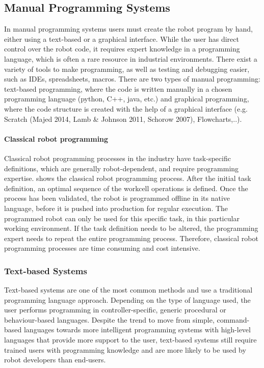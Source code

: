 \subsection{Manual Programming Systems}\label{subsec:Manual Programming Systems}
In manual programming systems users must create the robot program by hand, either using a text-based or a graphical interface.
While the user has direct control over the robot code, it requires expert knowledge in a programming language, which is often a rare resource in industrial environments.
There exist a variety of tools to make programming, as well as testing and debugging easier, such as IDEs, spreadsheets, macros.
There are two types of manual programming: text-based programming, where the code is written manually in a chosen programming language (python, C++, java, etc.) and graphical programming, where the code structure is created with the help of a graphical interface (e.g. Scratch (Majed 2014, Lamb \& Johnson 2011, Schorow 2007), Flowcharts,..). 

\paragraph{Classical robot programming}\label{par:Classical RP}
Classical robot programming processes in the industry have task-specific definitions, which are generally robot-dependent, and require programming expertise.
 shows the classical robot programming process.
After the initial task definition, an optimal sequence of the workcell operations is defined.
Once the process has been validated, the robot is programmed offline in its native language, before it is pushed into production for regular execution.
The programmed robot can only be used for this specific task, in this particular working environment.
If the task definition needs to be altered, the programming expert needs to repeat the entire programming process.
Therefore, classical robot programming processes are time consuming and cost intensive.

\subsubsection{Text-based Systems}\label{sssec:Text-based Systems}
Text-based systems are one of the most common methods and use a traditional programming language approach. 
Depending on the type of language used, the user performs programming in controller-specific, generic procedural or behaviour-based languages.
Despite the trend to move from simple, command-based languages towards more intelligent programming systems with high-level languages that provide more support to the user, text-based systems still require trained users with programming knowledge and are more likely to be used by robot developers than end-users.

